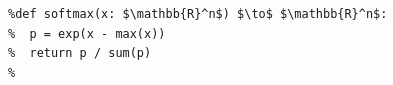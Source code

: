\documentclass[border=10pt]{standalone}
\begin{document}
\begin{lstlisting}
%def softmax(x: $\mathbb{R}^n$) $\to$ $\mathbb{R}^n$:
%  p = exp(x - max(x))
%  return p / sum(p)
%
\end{lstlisting}
\end{document}
